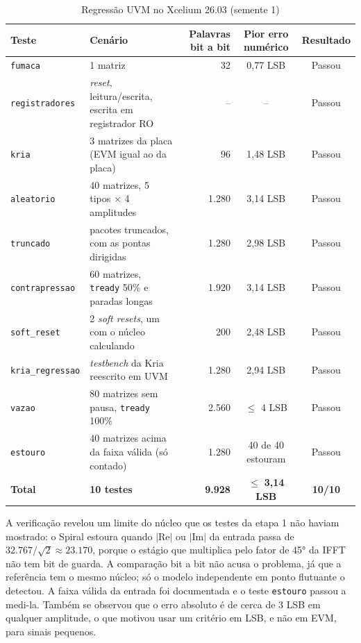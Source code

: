 \documentclass[conference]{IEEEtran}
\begin{document}
\begin{table}[htbp]
\caption{Regressão UVM no Xcelium 26.03 (semente 1)}
\label{tab_uvm}
\begin{center}
\begin{tabular}{|l|l|r|c|c|}
\hline
\textbf{Teste} & \textbf{Cenário} & \textbf{Palavras bit a bit} & \textbf{Pior erro numérico} & \textbf{Resultado} \\
\hline
\texttt{fumaca} & 1 matriz & 32 & 0,77 LSB & Passou \\
\texttt{registradores} & \textit{reset}, leitura/escrita, escrita em registrador RO & -- & -- & Passou \\
\texttt{kria} & 3 matrizes da placa (EVM igual ao da placa) & 96 & 1,48 LSB & Passou \\
\texttt{aleatorio} & 40 matrizes, 5 tipos $\times$ 4 amplitudes & 1.280 & 3,14 LSB & Passou \\
\texttt{truncado} & pacotes truncados, com as pontas dirigidas & 1.280 & 2,98 LSB & Passou \\
\texttt{contrapressao} & 60 matrizes, \texttt{tready} 50\% e paradas longas & 1.920 & 3,14 LSB & Passou \\
\texttt{soft\_reset} & 2 \textit{soft resets}, um com o núcleo calculando & 200 & 2,48 LSB & Passou \\
\texttt{kria\_regressao} & \textit{testbench} da Kria reescrito em UVM & 1.280 & 2,94 LSB & Passou \\
\texttt{vazao} & 80 matrizes sem pausa, \texttt{tready} 100\% & 2.560 & $\leq$ 4 LSB & Passou \\
\texttt{estouro} & 40 matrizes acima da faixa válida (só contado) & 1.280 & 40 de 40 estouram & Passou \\
\hline
\textbf{Total} & \textbf{10 testes} & \textbf{9.928} & $\leq$ \textbf{3,14 LSB} & \textbf{10/10} \\
\hline
\end{tabular}
\end{center}
\end{table}

A verificação revelou um limite do núcleo que os testes da etapa 1 não haviam mostrado: o Spiral estoura quando $|\text{Re}|$ ou $|\text{Im}|$ da entrada passa de $32.767/\sqrt{2} \approx 23.170$, porque o estágio que multiplica pelo fator de 45° da IFFT não tem bit de guarda. A comparação bit a bit não acusa o problema, já que a referência tem o mesmo núcleo; só o modelo independente em ponto flutuante o detectou. A faixa válida da entrada foi documentada e o teste \texttt{estouro} passou a medi-la. Também se observou que o erro absoluto é de cerca de 3 LSB em qualquer amplitude, o que motivou usar um critério em LSB, e não em EVM, para sinais pequenos.
\end{document}
